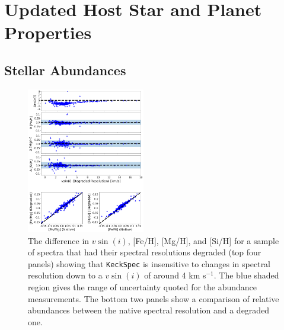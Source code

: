\documentclass[twocolumn]{aastex631}
\begin{document}
\section{Updated Host Star and Planet Properties}
\subsection{Stellar Abundances}

\label{sec:abundances}

\begin{figure}
    \centering
    \includegraphics[width=0.46\textwidth]{keckspec_resolution_dependence.png}
   
    \caption{The difference in $v\sin{(i)}$, [Fe/H], [Mg/H], and [Si/H] for a sample of spectra that had their spectral resolutions degraded (top four panels) showing that \texttt{KeckSpec} is insensitive to changes in spectral resolution down to a $v\sin{(i)}$ of around 4 km s$^{-1}$. The blue shaded region gives the range of uncertainty quoted for the abundance measurements. The bottom two panels show a comparison of relative abundances between the native spectral resolution and a degraded one.   }
    \label{fig:resolution_test}
\end{figure}
\end{document}

